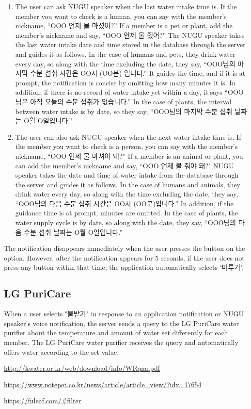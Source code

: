 \documentclass[conference]{IEEEtran}
\begin{document}
\begin{itemize}
\begin{enumerate}
\item The user can ask NUGU speaker when the last water intake time is. If the member you want to check is a human, you can say with the member's nickname, “OOO 언제 물 마셨어?” If a member is a pet or plant, add the member's nickname and say, “OOO 언제 물 줬어?” The NUGU speaker takes the last water intake date and time stored in the database through the server and guides it as follows. In the case of humans and pets, they drink water every day, so along with the time excluding the date, they say, “OOO님의 마지막 수분 섭취 시간은 OO시 (OO분) 입니다.” It guides the time, and if it is at prompt, the notification is concise by omitting how many minutes it is. In addition, if there is no record of water intake yet within a day, it says “OOO님은 아직 오늘의 수분 섭취가 없습니다.” In the case of plants, the interval between water intake is by date, so they say, “OOO님의 마지막 수분 섭취 날짜는 O월 O일입니다.”

\item The user can also ask NUGU speaker when the next water intake time is. If the member you want to check is a person, you can say with the member's nickname, “OOO 언제 물 마셔야 돼?” If a member is an animal or plant, you can add the member's nickname and say, “OOO 언제 물 줘야 돼?" NUGU speaker takes the date and time of water intake from the database through the server and guides it as follows. In the case of humans and animals, they drink water every day, so along with the time excluding the date, they say, “OOO님의 다음 수분 섭취 시간은 OO시 (OO분)입니다.” In addition, if the guidance time is at prompt, minutes are omitted. In the case of plants, the water supply cycle is by date, so along with the date, they say, “OOO님의 다음 수분 섭취 날짜는 O월 O일입니다.”
\end{enumerate}

The notification disappears immediately when the user presses the button on the option. However, after the notification appears for 5 seconds, if the user does not press any button within that time, the application automatically selects ‘미루기’.

\end{itemize}

\subsection{LG PuriCare}
\setlength{\parindent}{2ex}

When a user selects "물받기" in response to an application notification or NUGU speaker's voice notification, the server sends a query to the LG PuriCare water purifier about the temperature and amount of water set differently for each member. The LG PuriCare water purifier receives the query and automatically offers water according to the set value.


\begin{thebibliography}{00}
\url{http://kwater.or.kr/web/download/info/WRqna.pdf}

\url{https://www.notepet.co.kr/news/article/article_view/?idx=17654}

\url{https://fuleaf.com/#filter}


\end{thebibliography}
\end{document}
